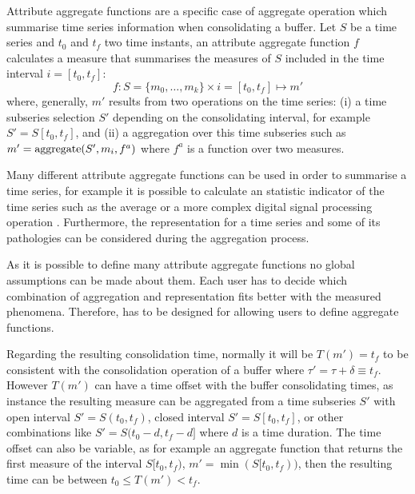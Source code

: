 Attribute aggregate functions are a specific case of  aggregate
operation which summarise time series information when consolidating a
buffer. Let $S$ be a time series and $t_0$ and $t_f$ two time
instants, an attribute aggregate function $f$ calculates a measure
that summarises the measures of $S$ included in the time interval
$i=[t_0,t_f]$:
\[
f : S=\{m_0,\ldots,m_k\} \times i=[t_0,t_f] \mapsto m'
\]
where, generally, $m'$ results from two operations on the time series:
(i) a time subseries selection $S'$ depending on the consolidating
interval, for example $S' = S[t_0,t_f]$, and (ii) a  aggregation
over this time subseries such as $m' = \operatorname*{aggregate}(S',m_i, f^a)$ where $f^a$
is a function over two measures.


Many different attribute aggregate functions can be used in order to
summarise a time series, for example it is possible to calculate an
statistic indicator of the time series such as the average or a more
complex digital signal processing operation
\cite{zhang11}. Furthermore, the representation for a time series and
some of its pathologies can be considered during the aggregation
process.


As it is possible to define many attribute aggregate
functions no global assumptions can be made about them. Each user has
to decide which combination of aggregation and representation fits
better with the measured phenomena.  Therefore,  has to be
designed for allowing users to define aggregate functions.





Regarding the resulting consolidation time, normally it will be
$T(m')=t_f$ to be consistent with the consolidation operation of a
buffer where $\tau' = \tau + \delta \equiv t_f$. However $T(m')$ can
have a time offset with the buffer consolidating times, as instance
the resulting measure can be aggregated from a time subseries $S'$
with open interval $S'=S(t_0,t_f)$, closed interval $S'=S[t_0,t_f]$,
or other combinations like $S'=S(t_0-d,t_f-d]$ where $d$ is a time
duration.  The time offset can also be variable, as for example an
aggregate function that returns the first measure of the interval
$S[t_0,t_f)$, $m'=\min(S[t_0,t_f))$, then the resulting time can be
between $t_0 \leq T(m') < t_f$.

